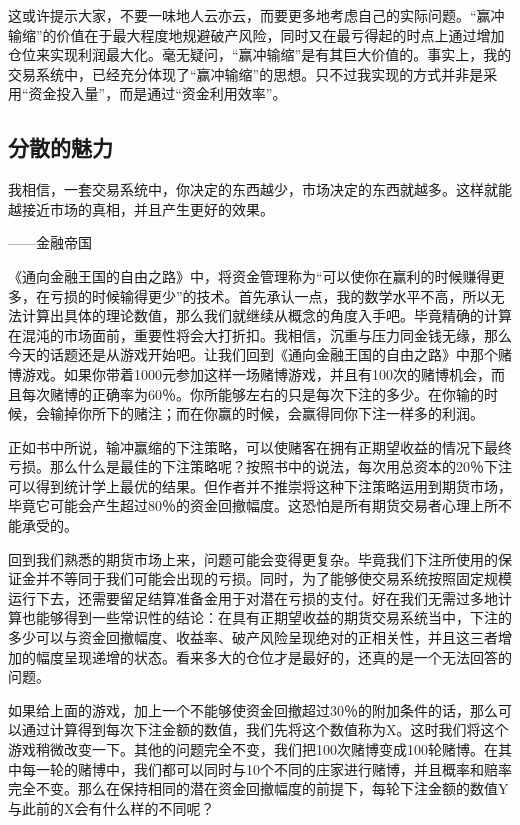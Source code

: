 这或许提示大家，不要一味地人云亦云，而要更多地考虑自己的实际问题。“赢冲输缩”的价值在于最大程度地规避破产风险，同时又在最亏得起的时点上通过增加仓位来实现利润最大化。毫无疑问，“赢冲输缩”是有其巨大价值的。事实上，我的交易系统中，已经充分体现了“赢冲输缩”的思想。只不过我实现的方式并非是采用“资金投入量”，而是通过“资金利用效率”。

\subsection{分散的魅力}

{\kaishu
我相信，一套交易系统中，你决定的东西越少，市场决定的东西就越多。这样就能越接近市场的真相，并且产生更好的效果。

\hfill ——金融帝国
}

《通向金融王国的自由之路》中，将资金管理称为“可以使你在赢利的时候赚得更多，在亏损的时候输得更少”的技术。首先承认一点，我的数学水平不高，所以无法计算出具体的理论数值，那么我们就继续从概念的角度入手吧。毕竟精确的计算在混沌的市场面前，重要性将会大打折扣。我相信，沉重与压力同金钱无缘，那么今天的话题还是从游戏开始吧。让我们回到《通向金融王国的自由之路》中那个赌博游戏。如果你带着1000元参加这样一场赌博游戏，并且有100次的赌博机会，而且每次赌博的正确率为60％。你所能够左右的只是每次下注的多少。在你输的时候，会输掉你所下的赌注；而在你赢的时候，会赢得同你下注一样多的利润。

正如书中所说，输冲赢缩的下注策略，可以使赌客在拥有正期望收益的情况下最终亏损。那么什么是最佳的下注策略呢？按照书中的说法，每次用总资本的20％下注可以得到统计学上最优的结果。但作者并不推崇将这种下注策略运用到期货市场，毕竟它可能会产生超过80％的资金回撤幅度。这恐怕是所有期货交易者心理上所不能承受的。

回到我们熟悉的期货市场上来，问题可能会变得更复杂。毕竟我们下注所使用的保证金并不等同于我们可能会出现的亏损。同时，为了能够使交易系统按照固定规模运行下去，还需要留足结算准备金用于对潜在亏损的支付。好在我们无需过多地计算也能够得到一些常识性的结论：在具有正期望收益的期货交易系统当中，下注的多少可以与资金回撤幅度、收益率、破产风险呈现绝对的正相关性，并且这三者增加的幅度呈现递增的状态。看来多大的仓位才是最好的，还真的是一个无法回答的问题。

如果给上面的游戏，加上一个不能够使资金回撤超过30％的附加条件的话，那么可以通过计算得到每次下注金额的数值，我们先将这个数值称为X。这时我们将这个游戏稍微改变一下。其他的问题完全不变，我们把100次赌博变成100轮赌博。在其中每一轮的赌博中，我们都可以同时与10个不同的庄家进行赌博，并且概率和赔率完全不变。那么在保持相同的潜在资金回撤幅度的前提下，每轮下注金额的数值Y与此前的X会有什么样的不同呢？

